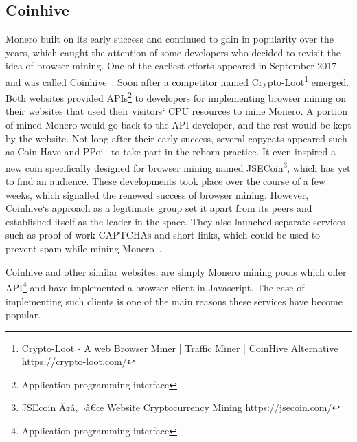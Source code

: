 \subsection{Coinhive}




Monero built on its early success and continued to gain in popularity over the years, which caught the attention of some developers who decided to revisit the idea of browser mining. One of the earliest efforts appeared in September 2017 and was called Coinhive~\cite{coinhive}. Soon after a competitor named Crypto-Loot\footnote{Crypto-Loot - A web Browser Miner | Traffic Miner | CoinHive Alternative \url{https://crypto-loot.com/}} emerged. Both websites provided APIs\footnote{Application programming interface} to developers for implementing browser mining on their websites that used their visitors` CPU resources to mine Monero. A portion of mined Monero would go back to the API developer, and the rest would be kept by the website. Not long after their early success, several copycats appeared such as Coin-Have and PPoi~\cite{coinhivecopycats} to take part in the reborn practice. It even inspired a new coin specifically designed for browser mining named JSECoin\footnote{JSEcoin Ã¢â‚¬â€œ Website Cryptocurrency Mining \url{https://jsecoin.com/}}, which has yet to find an audience. These developments took place over the course of a few weeks, which signalled the renewed success of browser mining. However, Coinhive`s approach as a legitimate group set it apart from its peers and established itself as the leader in the space. They also launched separate services such as proof-of-work CAPTCHAs and short-links, which could be used to prevent spam while mining Monero~\cite{coinhive}.

Coinhive and other similar websites, are simply Monero mining pools which offer API\footnote{Application programming interface} and have implemented a browser client in Javascript. The ease of implementing such clients is one of the main reasons these services have become popular. 







